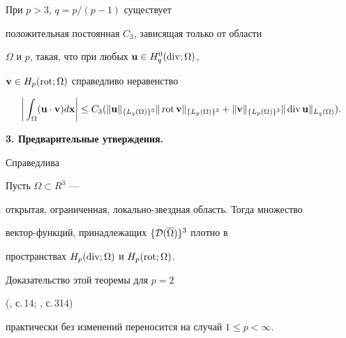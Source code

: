 \begin{thms}\label{t3}


При ${p>3}$, ${q=p/(p-1)}$  существует


положительная постоянная $C_3$, зависящая только от области


$\Omega$ и $p$, такая, что при любых $\bold{u}\in H_q^0(\operatorname{div};\Omega)$,


$\bold{v}\in H_p(\operatorname{rot};\Omega)$ справедливо неравенство


\begin{equation}


\bigg|\int_{\Omega}(\bold{u}\cdot\bold{v})d\bold x\bigg|\leq


C_3(\| \bold{u} \|_{\{ L_q(\Omega)\}^3}\| \Rot\bold{v} \|


_{\{ L_p(\Omega)\}^3}+\| \bold{v} \|_{\{ L_p(\Omega)\}^3}\| 


\Div\bold{u} \|_{L_q(\Omega)}).


\label{o3} \end{equation}


\end{thms}


\addtocounter{section}{1}


\setcounter{equation}{0}


\setcounter{thms}{0}


\setcounter{lems}{0}





{\bf 3. Предварительные утверждения.}


Справедлива





\begin{thms}\label{tpl}


Пусть $\Omega\subset R^3$ ---


открытая, ограниченная, локально-звездная область. Тогда множество


вектор-функций, принадлежащих $\{{\cal D}(\overline{\Omega})\}^3$ плотно в


пространствах $H_p(\operatorname{div};\Omega)$ и $H_p(\operatorname{rot};\Omega)$.


\end{thms}





Доказательство этой теоремы для $p=2$


(\cite{4}, с.\,14; \cite{5}, с.\,314)


практически без изменений переносится на случай $1\leq p<\infty$.





